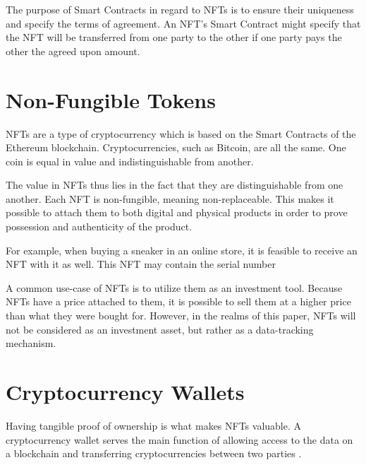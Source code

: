 The purpose of Smart Contracts in regard to NFTs is to ensure their uniqueness and specify the terms of agreement. An NFT's Smart Contract might specify that the NFT will be transferred from one party to the other if one party pays the other the agreed upon amount.


%
%
\section{Non-Fungible Tokens}
\label{sec:background:nfts}
NFTs are a type of cryptocurrency which is based on the Smart Contracts of the Ethereum blockchain. Cryptocurrencies, such as Bitcoin, are all the same. One coin is equal in value and indistinguishable from another. \cite{nftOverview}

The value in NFTs thus lies in the fact that they are distinguishable from one another. Each NFT is non-fungible, meaning non-replaceable. This makes it possible to attach them to both digital and physical products in order to prove possession and authenticity of the product. \cite{nftOverview}


For example, when buying a sneaker in an online store, it is feasible to receive an NFT with it as well. This NFT may contain the serial number %

A common use-case of NFTs is to utilize them as an investment tool. Because NFTs have a price attached to them, it is possible to sell them at a higher price than what they were bought for. However, in the realms of this paper, NFTs will not be considered as an investment asset, but rather as a data-tracking mechanism. %

%
%
\section{Cryptocurrency Wallets}
\label{sec:background:wallets}

Having tangible proof of ownership is what makes NFTs valuable. A cryptocurrency wallet serves the main function of allowing access to the data on a blockchain and transferring cryptocurrencies between two parties \cite{wallets1}.

